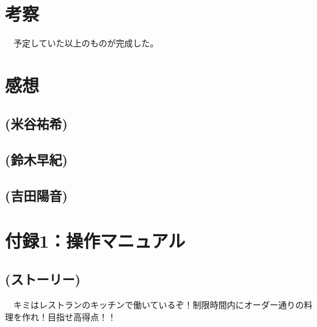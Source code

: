 \documentclass[a4j]{jarticle} %
\begin{document}
\begin{figure}[H]
  \begin{center}
  \end{center}
\end{figure}

\section{考察}
　予定していた以上のものが完成した。%

\section{感想}
\subsection*{(米谷祐希)}
\subsection*{(鈴木早紀)}
\subsection*{(吉田陽音)}


\newpage
\section*{付録1：操作マニュアル}
\subsection*{(ストーリー)}
　キミはレストランのキッチンで働いているぞ！制限時間内にオーダー通りの料理を作れ！目指せ高得点！！
\end{document}
